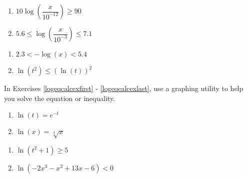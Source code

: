 \documentclass{ximera}
\begin{document}
\begin{enumerate}
\setcounter{enumi}{\value{HW}}

\item $10\log\left(\dfrac{x}{10^{-12}}\right) \geq 90$ \label{sixfourdecibelineq} 
\item $5.6 \leq \log\left(\dfrac{x}{10^{-3}}\right) \leq 7.1$ \label{sixfourRichterineq}


\setcounter{HW}{\value{enumi}}
\end{enumerate}

\begin{enumerate}
\setcounter{enumi}{\value{HW}}


\item $2.3 < -\log(x) < 5.4$ \label{sixfourpHineq} 

\item $\ln(t^{2}) \leq (\ln(t))^{2}$ \label{solvelogineqexlast} 

\setcounter{HW}{\value{enumi}}
\end{enumerate}

\pagebreak

In Exercises \ref{logeqcalcexfirst} - \ref{logeqcalcexlast}, use a graphing utility to help you solve the equation or  inequality.

\begin{enumerate}
\setcounter{enumi}{\value{HW}}

\item $\ln(t) = e^{-t}$ \label{logeqcalcexfirst} 
\item $\ln(x) = \sqrt[4]{x}$ 

\setcounter{HW}{\value{enumi}}
\end{enumerate}

\begin{enumerate}
\setcounter{enumi}{\value{HW}}

\item $\ln(t^{2} + 1) \geq 5$
\item $\ln(-2x^{3} - x^{2} + 13x - 6) < 0$ \label{logeqcalcexlast} 

\setcounter{HW}{\value{enumi}}
\end{enumerate}
\end{document}
